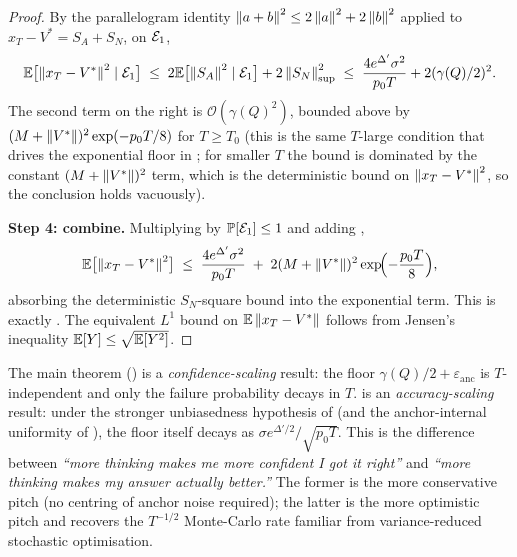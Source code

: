 \begin{proof}
By the parallelogram identity $\left\| a+b \right\|^2 \le 2\left\| a \right\|^2 + 2\left\| b \right\|^2$
applied to $x_T - V^* = S_A + S_N$, on $\mathcal{E}_1$,
\begin{align}\label{eq:vr_combined}
   \mathbb{E}\bigl[\left\| x_T - V^* \right\|^2 \mid \mathcal{E}_1\bigr]
   \;\le\; 2 \mathbb{E}\bigl[\left\| S_A \right\|^2 \mid \mathcal{E}_1\bigr] + 2 \left\| S_N \right\|^2_{\sup}
   \;\le\; \frac{4 e^{\Delta'} \sigma^2}{p_0 T} + 2 (\gamma(Q)/2)^2.
\end{align}
The second term on the right is $\mathcal{O}(\gamma(Q)^2)$, bounded above
by $(M + \left\| V^* \right\|)^2 \exp(-p_0 T/8)$ for $T \ge T_0$ (this is the same
$T$-large condition that drives the exponential floor in
; for smaller $T$ the bound
 is dominated by the constant
$(M + \left\| V^* \right\|)^2$ term, which is the deterministic bound on
$\left\| x_T - V^* \right\|^2$, so the conclusion holds vacuously).

\noindent\textbf{Step 4: combine.}
Multiplying  by $\mathbb{P}[\mathcal{E}_1] \le 1$ and adding
,
\begin{align*}
   \mathbb{E}\bigl[\left\| x_T - V^* \right\|^2\bigr]
   \;\le\;
   \frac{4 e^{\Delta'} \sigma^2}{p_0 T}
   \;+\;
   2 (M + \left\| V^* \right\|)^2 \exp\!\Bigl(-\frac{p_0 T}{8}\Bigr),
\end{align*}
absorbing the deterministic $S_N$-square bound into the exponential
term. This is exactly . The equivalent
$L^1$ bound on $\mathbb{E}\left\| x_T - V^* \right\|$ follows from Jensen's inequality
$\mathbb{E}[Y] \le \sqrt{\mathbb{E}[Y^2]}$.
\end{proof}

\begin{remark}\label{rem:accuracy_vs_confidence_scaling}
The main theorem () is a
\emph{confidence-scaling} result: the floor
$\gamma(Q)/2 + \varepsilon_{\mathrm{anc}}$ is $T$-independent and only
the failure probability decays in $T$.  is
an \emph{accuracy-scaling} result: under the stronger unbiasedness
hypothesis of  (and the anchor-internal
uniformity of ), the floor itself
decays as $\sigma e^{\Delta'/2} / \sqrt{p_0 T}$. This is the difference
between \emph{``more thinking makes me more confident I got it right''}
and \emph{``more thinking makes my answer actually better.''} The
former is the more conservative pitch (no centring of anchor noise
required); the latter is the more optimistic pitch and recovers the
$T^{-1/2}$ Monte-Carlo rate familiar from variance-reduced stochastic
optimisation.
\end{remark}
